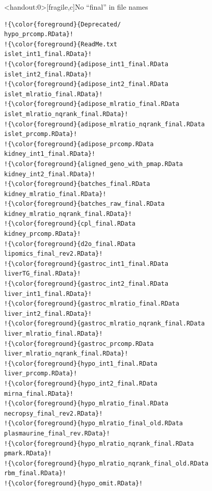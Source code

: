 \documentclass[12pt,t]{beamer}
\begin{document}
\begin{frame}<handout:0>[fragile,c]{No ``{\hilit final}'' in file names}


\addtocounter{framenumber}{-1}

\begin{center}
\begin{minipage}[c]{9.5cm}
\begin{semiverbatim}
\lstset{basicstyle=\tiny}
\begin{lstlisting}[escapechar=!,linewidth=9.5cm]
!{\color{foreground}{Deprecated/                            hypo_prcomp.RData}!
!{\color{foreground}{ReadMe.txt                             islet_int1_final.RData}!
!{\color{foreground}{adipose_int1_final.RData               islet_int2_final.RData}!
!{\color{foreground}{adipose_int2_final.RData               islet_mlratio_final.RData}!
!{\color{foreground}{adipose_mlratio_final.RData            islet_mlratio_nqrank_final.RData}!
!{\color{foreground}{adipose_mlratio_nqrank_final.RData     islet_prcomp.RData}!
!{\color{foreground}{adipose_prcomp.RData                   kidney_int1_final.RData}!
!{\color{foreground}{aligned_geno_with_pmap.RData           kidney_int2_final.RData}!
!{\color{foreground}{batches_final.RData                    kidney_mlratio_final.RData}!
!{\color{foreground}{batches_raw_final.RData                kidney_mlratio_nqrank_final.RData}!
!{\color{foreground}{cpl_final.RData                        kidney_prcomp.RData}!
!{\color{foreground}{d2o_final.RData                        lipomics_final_rev2.RData}!
!{\color{foreground}{gastroc_int1_final.RData               liverTG_final.RData}!
!{\color{foreground}{gastroc_int2_final.RData               liver_int1_final.RData}!
!{\color{foreground}{gastroc_mlratio_final.RData            liver_int2_final.RData}!
!{\color{foreground}{gastroc_mlratio_nqrank_final.RData     liver_mlratio_final.RData}!
!{\color{foreground}{gastroc_prcomp.RData                   liver_mlratio_nqrank_final.RData}!
!{\color{foreground}{hypo_int1_final.RData                  liver_prcomp.RData}!
!{\color{foreground}{hypo_int2_final.RData                  mirna_final.RData}!
!{\color{foreground}{hypo_mlratio_final.RData               necropsy_final_rev2.RData}!
!{\color{foreground}{hypo_mlratio_final_old.RData           plasmaurine_final_rev.RData}!
!{\color{foreground}{hypo_mlratio_nqrank_final.RData        pmark.RData}!
!{\color{foreground}{hypo_mlratio_nqrank_final_old.RData    rbm_final.RData}!
!{\color{foreground}{hypo_omit.RData}!
\end{lstlisting}
\end{semiverbatim}
\end{minipage}
\end{center}


\end{frame}
\end{document}
